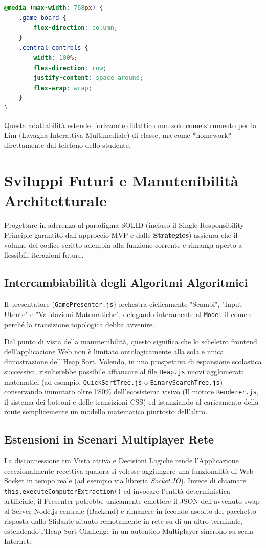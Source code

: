\documentclass[openany]{theme/uniprthesis}
\begin{document}
\begin{lstlisting}[language=CSS, breaklines=true, basicstyle=\footnotesize\ttfamily, frame=single, caption={Rigenerazione layout in verticale (Mobile-Friendly)}, keywordstyle=\color{blue}]
@media (max-width: 768px) {
    .game-board {
        flex-direction: column;
    }
    .central-controls {
        width: 100%;
        flex-direction: row;
        justify-content: space-around;
        flex-wrap: wrap;
    }
}
\end{lstlisting}
Questa adattabilità estende l'orizzonte didattico non solo come strumento per la Lim (Lavagna Interattiva Multimediale) di classe, ma come *homework* direttamente dal telefono dello studente.

\section{Sviluppi Futuri e Manutenibilità Architetturale}
Progettare in aderenza al paradigma SOLID (incluso il Single Responsibility Principle garantito dall'approccio MVP e dalle \textbf{Strategies}) assicura che il volume del codice scritto adempia alla funzione corrente e rimanga aperto a flessibili iterazioni future.

\subsection{Intercambiabilità degli Algoritmi Algoritmici}
Il presentatore (\texttt{GamePresenter.js}) orchestra ciclicamente "Scambi", "Input Utente" e "Validazioni Matematiche", delegando interamente al \texttt{Model} il come e perché la transizione topologica debba avvenire. 

Dal punto di vista della manutenibilità, questo significa che lo scheletro frontend dell'applicazione Web non è limitato ontologicamente alla sola e unica dimostrazione dell'Heap Sort. Volendo, in una prospettiva di espansione scolastica successiva, risulterebbe possibile affiancare al file \texttt{Heap.js} nuovi agglomerati matematici (ad esempio, \texttt{QuickSortTree.js} o \texttt{BinarySearchTree.js}) conservando immutato oltre l'80\% dell'ecosistema visivo (Il motore \texttt{Renderer.js}, il sistema dei bottoni e delle transizioni CSS) ed istanziando al caricamento della route semplicemente un modello matematico piuttosto dell'altro.

\subsection{Estensioni in Scenari Multiplayer Rete}
La disconnessione tra Vista attiva e Decisioni Logiche rende l'Applicazione eccezionalmente recettiva qualora si volesse aggiungere una funzionalità di Web Socket in tempo reale (ad esempio via libreria \textit{Socket.IO}).
Invece di chiamare \texttt{this.executeComputerExtraction()} ed invocare l'entità deterministica artificiale, il Presenter potrebbe unicamente emettere il JSON dell'avvenuto swap al Server Node.js centrale (Backend) e rimanere in fecondo ascolto del pacchetto risposta dallo Sfidante situato remotamente in rete su di un altro terminale, estendendo l'Heap Sort Challenge in un autentico Multiplayer sincrono su scala Internet.
\end{document}
